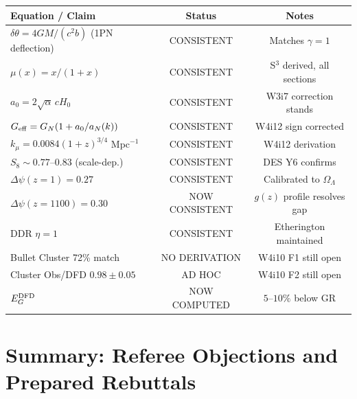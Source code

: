 \documentclass[11pt,a4paper]{article}
\newcommand{\Geff}{G_{\rm eff}}
\newcommand{\kmu}{k_\mu}
\newcommand{\Dpsi}{\Delta\psi}
\begin{document}
\begin{center}
\begin{tabular}{lcc}
\toprule
Equation / Claim & Status & Notes \\
\midrule
$\delta\theta = 4GM/(c^2 b)$ (1PN deflection) & CONSISTENT & Matches $\gamma = 1$ \\
$\mu(x) = x/(1+x)$ & CONSISTENT & S$^3$ derived, all sections \\
$a_0 = 2\sqrt{\alpha}\,cH_0$ & CONSISTENT & W3i7 correction stands \\
$\Geff = G_N(1 + a_0/a_N(k))$ & CONSISTENT & W4i12 sign corrected \\
$\kmu = 0.0084(1+z)^{3/4}$ Mpc$^{-1}$ & CONSISTENT & W4i12 derivation \\
$S_8 \sim 0.77$--$0.83$ (scale-dep.) & CONSISTENT & DES Y6 confirms \\
$\Dpsi(z=1) = 0.27$ & CONSISTENT & Calibrated to $\Omega_\Lambda$ \\
$\Dpsi(z=1100) = 0.30$ & NOW CONSISTENT & $g(z)$ profile resolves gap \\
DDR $\eta = 1$ & CONSISTENT & Etherington maintained \\
Bullet Cluster 72\% match & NO DERIVATION & W4i10 F1 still open \\
Cluster Obs/DFD $0.98 \pm 0.05$ & AD HOC & W4i10 F2 still open \\
$E_G^{\rm DFD}$ & NOW COMPUTED & $5$--$10\%$ below GR \\
\bottomrule
\end{tabular}
\end{center}


\section{Summary: Referee Objections and Prepared Rebuttals}
\end{document}
